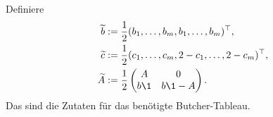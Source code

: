 \begin{solution}
\begin{enumerate}[label = \textbf{\alph*)}]
\begin{align*}
  \end{align*}
  Definiere
  \begin{align*}
  \widetilde{b} &:= \frac{1}{2}(b_1,\dots,b_m,b_1,\dots,b_m)^{\top}, \\
  \widetilde{c} &:= \frac{1}{2}(c_1,\dots,c_m,2-c_1,\dots,2-c_m)^{\top}, \\
  \widetilde{A} &:= \frac{1}{2}\begin{pmatrix}
    A & 0 \\
    b\1 & b\1 - A
  \end{pmatrix}.
  \end{align*}
  Das sind die Zutaten für das benötigte Butcher-Tableau.
\end{enumerate}
\end{solution}

